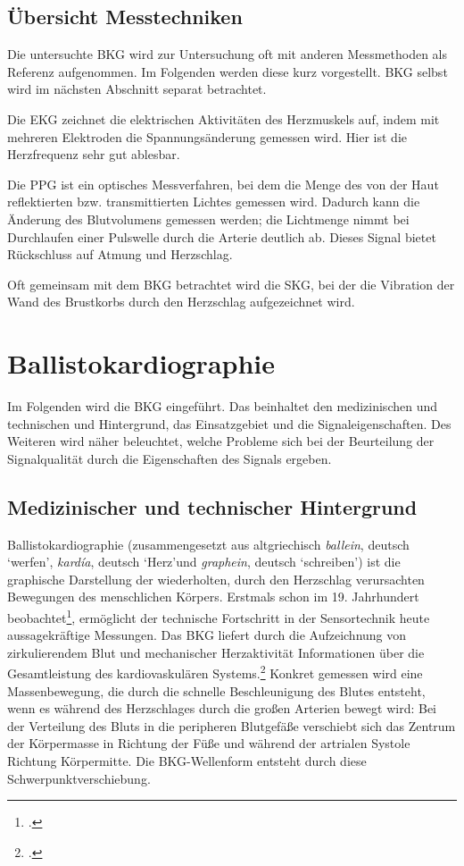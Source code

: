 	\subsection{Übersicht Messtechniken}
	
	Die untersuchte \ac{BKG} wird zur Untersuchung oft mit anderen Messmethoden als Referenz aufgenommen. Im Folgenden werden diese kurz vorgestellt. \ac{BKG} selbst wird im nächsten Abschnitt separat betrachtet.
	
	Die \ac{EKG} zeichnet die elektrischen Aktivitäten des Herzmuskels auf, indem mit mehreren Elektroden die Spannungsänderung gemessen wird. Hier ist die Herzfrequenz sehr gut ablesbar.
	
	Die \ac{PPG} ist ein optisches Messverfahren, bei dem die Menge des von der Haut reflektierten bzw. transmittierten Lichtes gemessen wird. Dadurch kann die Änderung des Blutvolumens gemessen werden; die Lichtmenge nimmt bei Durchlaufen einer Pulswelle durch die Arterie deutlich ab. Dieses Signal bietet Rückschluss auf Atmung und Herzschlag.
	
	Oft gemeinsam mit dem \ac{BKG} betrachtet wird die \ac{SKG}, bei der die Vibration der Wand des Brustkorbs durch den Herzschlag aufgezeichnet wird.

	\section{Ballistokardiographie}
	
	Im Folgenden wird die \acl{BKG} eingeführt. Das beinhaltet den medizinischen und technischen und Hintergrund, das Einsatzgebiet und die Signaleigenschaften. Des Weiteren wird näher beleuchtet, welche Probleme sich bei der Beurteilung der Signalqualität durch die Eigenschaften des Signals ergeben.
	
	\subsection{Medizinischer und technischer Hintergrund}
	
	Ballistokardiographie (zusammengesetzt aus altgriechisch \textit{ballein}, deutsch \textquoteleft werfen\textquoteright, \textit{kardía}, deutsch \textquoteleft Herz\textquoteright und \textit{graphein}, deutsch \textquoteleft schreiben\textquoteright) ist die graphische Darstellung der wiederholten, durch den Herzschlag verursachten Bewegungen des menschlichen Körpers. Erstmals schon im 19. Jahrhundert beobachtet\footcite[Vgl.][]{Gordon1877}, ermöglicht der technische Fortschritt in der Sensortechnik heute aussagekräftige Messungen. Das \ac{BKG} liefert durch die Aufzeichnung von zirkulierendem Blut und mechanischer Herzaktivität Informationen über die Gesamtleistung des kardiovaskulären Systems.\footcite[Vgl.][]{Pinheiro2010} Konkret gemessen wird eine Massenbewegung, die durch die schnelle Beschleunigung des Blutes entsteht, wenn es während des Herzschlages durch die großen Arterien bewegt wird: Bei der Verteilung des Bluts in die peripheren Blutgefäße verschiebt sich das Zentrum der Körpermasse in Richtung der Füße und während der artrialen Systole Richtung Körpermitte. Die \ac{BKG}-Wellenform entsteht durch diese Schwerpunktverschiebung.
	
